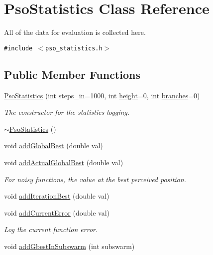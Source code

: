 \hypertarget{classPsoStatistics}{
\section{PsoStatistics Class Reference}
\label{classPsoStatistics}
}
All of the data for evaluation is collected here.  


{\tt \#include $<$pso\_\-statistics.h$>$}

\subsection*{Public Member Functions}
\begin{CompactItemize}
\item 
\hyperlink{classPsoStatistics_33694c00160dc114f263bd4bb53ad326}{PsoStatistics} (int steps\_\-in=1000, int \hyperlink{runpso_8cpp_d12fc34ce789bce6c8a05d8a17138534}{height}=0, int \hyperlink{runpso_8cpp_862f1f1b7a79e1acd3a882c444a7fa62}{branches}=0)
\begin{CompactList}\small\item\em The constructor for the statistics logging. \item\end{CompactList}\item 
\hyperlink{classPsoStatistics_4ac7c7d98d5b2e7f7f402ffae750e01d}{$\sim$PsoStatistics} ()
\item 
void \hyperlink{classPsoStatistics_1d3cbd813114a32bf18cc71c6a86251e}{addGlobalBest} (double val)
\item 
void \hyperlink{classPsoStatistics_22645aac349492460cb782a7c87ed3f4}{addActualGlobalBest} (double val)
\begin{CompactList}\small\item\em For noisy functions, the value at the best perceived position. \item\end{CompactList}\item 
void \hyperlink{classPsoStatistics_05194411c59d0027efa884a4cee08fd3}{addIterationBest} (double val)
\item 
void \hyperlink{classPsoStatistics_1fd7ea6e68ab77ad741a0dea3a26012e}{addCurrentError} (double val)
\begin{CompactList}\small\item\em Log the current function error. \item\end{CompactList}\item 
void \hyperlink{classPsoStatistics_3d49bfd4ef524a1e00bdc3fd60fec100}{addGbestInSubswarm} (int subswarm)

\end{CompactItemize}
